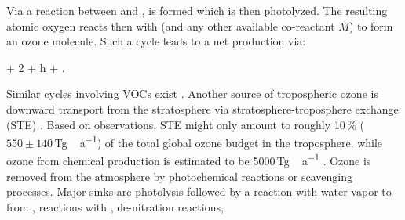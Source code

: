\documentclass[gmd, manuscript]{copernicus}
\begin{document}
Via a reaction between  and ,  is formed which is then photolyzed. The resulting atomic oxygen reacts then with  (and any other available co-reactant $M$) to form an ozone molecule.
Such a cycle leads to a net production via:
\begin{reaction}
   + 2 + h\nu \rightarrow {} + .
\end{reaction}
Similar cycles involving VOCs exist \citep{ACP:Monks2015}. Another source of tropospheric ozone is downward transport from the stratosphere via stratosphere-troposphere exchange (STE) \citep{WMO2014}. Based on observations, STE might only amount to roughly 10\,\unit{\%} ($550 \pm 140$\,\unit{Tg\,a^{-1}}) of the total global ozone budget in the troposphere, while ozone from chemical production is estimated to be 5000\,\unit{Tg\,a^{-1}} \citep{ACP:Monks2015}. Ozone is removed from the atmosphere by photochemical reactions or scavenging processes. Major sinks are photolysis followed by a reaction with water vapor to from ,
reactions with ,
de-nitration reactions,
\end{document}
